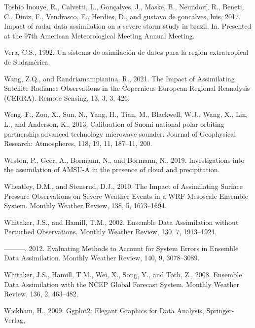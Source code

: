 \documentclass[12pt,oneside,a4paper]{reedthesis}
\begin{document}
\leavevmode\hypertarget{ref-toshioinouye2017}{}%
Toshio Inouye, R., Calvetti, L., Gonçalves, J., Maske, B., Neundorf, R., Beneti, C., Diniz, F., Vendrasco, E., Herdies, D., and gustavo de goncalves, luis, 2017. Impact of radar data assimilation on a severe storm study in brazil. In. Presented at the 97th American Meteorological Meeting Annual Meeting.

\leavevmode\hypertarget{ref-vera1992}{}%
Vera, C.S., 1992. Un sistema de asimilación de datos para la región extratropical de Sudamérica.

\leavevmode\hypertarget{ref-wang2021}{}%
Wang, Z.Q., and Randriamampianina, R., 2021. The Impact of Assimilating Satellite Radiance Observations in the Copernicus European Regional Reanalysis (CERRA). Remote Sensing, 13, 3, 3, 426.

\leavevmode\hypertarget{ref-weng2013}{}%
Weng, F., Zou, X., Sun, N., Yang, H., Tian, M., Blackwell, W.J., Wang, X., Lin, L., and Anderson, K., 2013. Calibration of Suomi national polar-orbiting partnership advanced technology microwave sounder. Journal of Geophysical Research: Atmospheres, 118, 19, 11, 187--11, 200.

\leavevmode\hypertarget{ref-weston2019}{}%
Weston, P., Geer, A., Bormann, N., and Bormann, N., 2019. Investigations into the assimilation of AMSU-A in the presence of cloud and precipitation.

\leavevmode\hypertarget{ref-wheatley2010}{}%
Wheatley, D.M., and Stensrud, D.J., 2010. The Impact of Assimilating Surface Pressure Observations on Severe Weather Events in a WRF Mesoscale Ensemble System. Monthly Weather Review, 138, 5, 1673--1694.

\leavevmode\hypertarget{ref-whitaker2002}{}%
Whitaker, J.S., and Hamill, T.M., 2002. Ensemble Data Assimilation without Perturbed Observations. Monthly Weather Review, 130, 7, 1913--1924.

\leavevmode\hypertarget{ref-whitaker2012}{}%
---------, 2012. Evaluating Methods to Account for System Errors in Ensemble Data Assimilation. Monthly Weather Review, 140, 9, 3078--3089.

\leavevmode\hypertarget{ref-whitaker2008}{}%
Whitaker, J.S., Hamill, T.M., Wei, X., Song, Y., and Toth, Z., 2008. Ensemble Data Assimilation with the NCEP Global Forecast System. Monthly Weather Review, 136, 2, 463--482.

\leavevmode\hypertarget{ref-wickham2009}{}%
Wickham, H., 2009. Ggplot2: Elegant Graphics for Data Analysis, Springer-Verlag,
\end{document}
